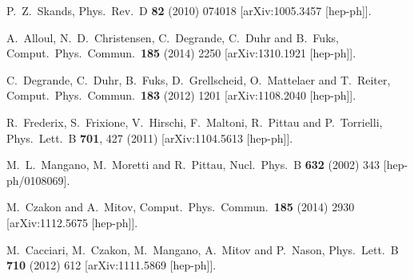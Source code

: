 \documentclass[preprintnumbers,superscriptaddress,nofootinbib,aps,prd,floatfix]{revtex4}
\begin{document}
\begin{thebibliography}{99}
  P.~Z.~Skands,
  Phys.\ Rev.\ D {\bf 82} (2010) 074018
  [arXiv:1005.3457 [hep-ph]].

  A.~Alloul, N.~D.~Christensen, C.~Degrande, C.~Duhr and B.~Fuks,
  Comput.\ Phys.\ Commun.\  {\bf 185} (2014) 2250
  [arXiv:1310.1921 [hep-ph]].

  C.~Degrande, C.~Duhr, B.~Fuks, D.~Grellscheid, O.~Mattelaer and T.~Reiter,
  Comput.\ Phys.\ Commun.\  {\bf 183} (2012) 1201
  [arXiv:1108.2040 [hep-ph]].

  R.~Frederix, S.~Frixione, V.~Hirschi, F.~Maltoni, R.~Pittau and P.~Torrielli,
  Phys.\ Lett.\ B {\bf 701}, 427 (2011)
  [arXiv:1104.5613 [hep-ph]].

  M.~L.~Mangano, M.~Moretti and R.~Pittau,
  Nucl.\ Phys.\ B {\bf 632} (2002) 343
  [hep-ph/0108069].
  
  
  M.~Czakon and A.~Mitov,
  Comput.\ Phys.\ Commun.\  {\bf 185} (2014) 2930
  [arXiv:1112.5675 [hep-ph]].

  M.~Cacciari, M.~Czakon, M.~Mangano, A.~Mitov and P.~Nason,
  Phys.\ Lett.\ B {\bf 710} (2012) 612
  [arXiv:1111.5869 [hep-ph]].
  

\end{thebibliography}
\end{document}
